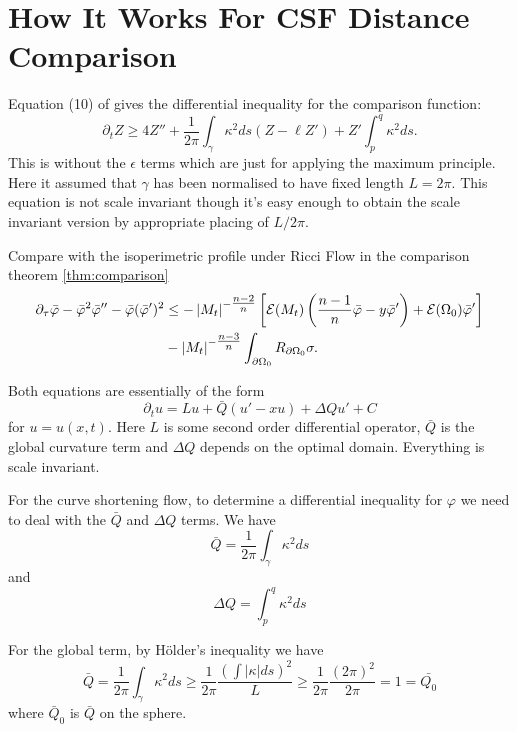 \documentclass{amsart}
\begin{document}
\subsection{}

\section{How It Works For CSF Distance Comparison}

Equation (10) of \cite{AndrewsBryan:01/2011} gives the differential inequality for the comparison function:
\[
\partial_t Z \geq 4 Z'' + \frac{1}{2\pi} \int_{\gamma} \kappa^2 ds (Z - \ell Z') + Z'\int_p^q \kappa^2 ds.
\]
This is without the \(\epsilon\) terms which are just for applying the maximum principle. Here it assumed that \(\gamma\) has been normalised to have fixed length \(L = 2\pi\). This equation is not scale invariant though it's easy enough to obtain the scale invariant version by appropriate placing of \(L/2\pi\).

Compare with the isoperimetric profile under Ricci Flow in the comparison theorem \ref{thm:comparison}
\[
\begin{split}
\partial_{\tau} \bar{\varphi} - \bar{\varphi}^2 \bar{\varphi}'' - \bar{\varphi}(\bar{\varphi}')^2 &\leq -\left|{M_t}\right|^{-\tfrac{n-2}{n}} \left[\operatorname{\mathcal{E}}(M_t)\left(\frac{n-1}{n} \bar{\varphi} - y \bar{\varphi}'\right) + \operatorname{\mathcal{E}}(\Omega_0)\bar{\varphi}'\right] \\
&- \left|{M_t}\right|^{-\tfrac{n-3}{n}}\int_{\partial {\Omega_0}} R_{\partial {\Omega_0}}\sigma.
\end{split}
\]

Both equations are essentially of the form
\[
\partial_t u = L u + \bar{Q} (u' - x u) + \Delta Q u' + C
\]
for \(u = u(x, t)\). Here \(L\) is some second order differential operator, \(\bar{Q}\) is the global curvature term and \(\Delta Q\) depends on the optimal domain. Everything is scale invariant.

For the curve shortening flow, to determine a differential inequality for \(\varphi\) we need to deal with the \(\bar{Q}\) and \(\Delta Q\) terms. We have
\[
\bar{Q} = \frac{1}{2\pi}\int_{\gamma} \kappa^2 ds
\]
and
\[
\Delta Q = \int_p^q \kappa^2 ds
\]

For the global term, by H\"older's inequality we have
\[
\bar{Q} = \frac{1}{2\pi} \int_{\gamma} \kappa^2 ds \geq \frac{1}{2\pi} \frac{\left(\int |\kappa| ds\right)^2}{L} \geq \frac{1}{2\pi} \frac{(2\pi)^2}{2\pi} = 1 = \bar{Q_0}
\]
where \(\bar{Q}_0\) is \(\bar{Q}\) on the sphere.
\end{document}
